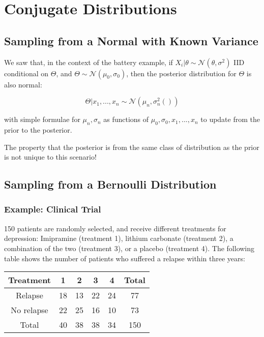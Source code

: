\documentclass[a4paper]{article}
\begin{document}
    \newpage
    \section{Conjugate Distributions}
        \subsection{Sampling from a Normal with Known Variance}
            We saw that, in the context of the battery example, if $X_i | \theta
            \sim \mathcal{N}(\theta, \sigma^2)$ IID conditional on $\Theta$, and
            $\Theta \sim \mathcal{N}(\mu_0, \sigma_0)$, then the posterior
            distribution for $\Theta$ is also normal:

            $$
                \Theta | x_1, ..., x_n \sim \mathcal{N}(\mu_n, \sigma_n^2())
            $$

            with simple formulae for $\mu_n, \sigma_n$ as functions of $\mu_0,
            \sigma_0, x_1, ..., x_n$ to update from the prior to the posterior.

            The property that the posterior is from the same class of
            distribution as the prior is not unique to this scenario!

        \subsection{Sampling from a Bernoulli Distribution}
            \subsubsection{Example: Clinical Trial}
                150 patients are randomly selected, and receive different
                treatments for depression: Imipramine (treatment 1), lithium
                carbonate (treatment 2), a combination of the two (treatment 3),
                or a placebo (treatment 4). The following table shows the number
                of patients who suffered a relapse within three years:

                \begin{center}
                    \begin{tabular}{c | c c c c | c}
                        Treatment & 1 & 2 & 3 & 4 & Total \\
                        \hline
                        Relapse & 18 & 13 & 22 & 24 & 77 \\
                        No relapse & 22 & 25 & 16 & 10 & 73 \\
                        \hline
                        Total & 40 & 38 & 38 & 34 & 150
                    \end{tabular}
                \end{center}
\end{document}
